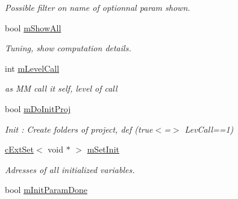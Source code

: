 \begin{DoxyCompactItemize}
\begin{DoxyCompactList}\small\item\em Possible filter on name of optionnal param shown. \end{DoxyCompactList}\item 
bool \hyperlink{classMMVII_1_1cMMVII__Appli_ab89b6c52a81c12bbb21abe229906547b}{m\+Show\+All}\hypertarget{classMMVII_1_1cMMVII__Appli_ab89b6c52a81c12bbb21abe229906547b}{}\label{classMMVII_1_1cMMVII__Appli_ab89b6c52a81c12bbb21abe229906547b}

\begin{DoxyCompactList}\small\item\em Tuning, show computation details. \end{DoxyCompactList}\item 
int \hyperlink{classMMVII_1_1cMMVII__Appli_a5f192b970853c0d1d37ed3426f018cf2}{m\+Level\+Call}\hypertarget{classMMVII_1_1cMMVII__Appli_a5f192b970853c0d1d37ed3426f018cf2}{}\label{classMMVII_1_1cMMVII__Appli_a5f192b970853c0d1d37ed3426f018cf2}

\begin{DoxyCompactList}\small\item\em as MM call it self, level of call \end{DoxyCompactList}\item 
bool \hyperlink{classMMVII_1_1cMMVII__Appli_a3f445afe4bfdca898617fcffe46e7d63}{m\+Do\+Init\+Proj}\hypertarget{classMMVII_1_1cMMVII__Appli_a3f445afe4bfdca898617fcffe46e7d63}{}\label{classMMVII_1_1cMMVII__Appli_a3f445afe4bfdca898617fcffe46e7d63}

\begin{DoxyCompactList}\small\item\em Init \+: Create folders of project, def (true$<$=$>$ Lev\+Call==1) \end{DoxyCompactList}\item 
\hyperlink{classMMVII_1_1cExtSet}{c\+Ext\+Set}$<$ void $\ast$ $>$ \hyperlink{classMMVII_1_1cMMVII__Appli_a65f9c8e17c158abfbb12d86988fb9a63}{m\+Set\+Init}\hypertarget{classMMVII_1_1cMMVII__Appli_a65f9c8e17c158abfbb12d86988fb9a63}{}\label{classMMVII_1_1cMMVII__Appli_a65f9c8e17c158abfbb12d86988fb9a63}

\begin{DoxyCompactList}\small\item\em Adresses of all initialized variables. \end{DoxyCompactList}\item 
bool \hyperlink{classMMVII_1_1cMMVII__Appli_aec64e7bc2232cdb0488137b178eb104c}{m\+Init\+Param\+Done}\hypertarget{classMMVII_1_1cMMVII__Appli_aec64e7bc2232cdb0488137b178eb104c}{}\label{classMMVII_1_1cMMVII__Appli_aec64e7bc2232cdb0488137b178eb104c}


\end{DoxyCompactItemize}

